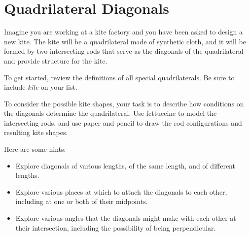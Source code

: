 \newpage

\section{Quadrilateral Diagonals}

Imagine you are working at a kite factory and you have been asked to design a new kite.  The kite will be a quadrilateral made of synthetic cloth, and it will be formed by two intersecting rods that serve as the diagonals of the quadrilateral and provide structure for the kite.  

\begin{prob}
To get started, review the definitions of all special quadrilaterals.  Be sure to include \emph{kite} on your list.  
\end{prob}

\begin{prob}
To consider the possible kite shapes, your task is to describe how conditions on the diagonals determine the quadrilateral.  Use fettuccine to model the intersecting rods, and use paper and pencil to draw the rod configurations and resulting kite shapes.  

Here are some hints:  

\begin{itemize}
\item Explore diagonals of various lengths, of the same length, and of different lengths.  
\item Explore various places at which to attach the diagonals to each other, including at one or both of their midpoints.  
\item Explore various angles that the diagonals might make with each other at their intersection, including the possibility of being perpendicular.  
\end{itemize}
\end{prob}

